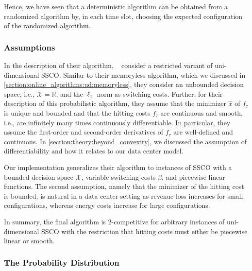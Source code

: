 Hence, we have seen that a deterministic algorithm can be obtained from a randomized algorithm by, in each time slot, choosing the expected configuration of the randomized algorithm.

\subsubsection{Assumptions}

In the description of their algorithm, \citeauthor{Bansal2015}~\cite{Bansal2015} consider a restricted variant of uni-dimensional SSCO. Similar to their memoryless algorithm, which we discussed in \cref{section:online_algorithms:ud:memoryless}, they consider an unbounded decision space, i.e., $\mathcal{X} = \mathbb{R}$, and the $\ell_1$ norm as switching costs. Further, for their description of this probabilistic algorithm, they assume that the minimizer $\hat{x}$ of $f_{\tau}$ is unique and bounded and that the hitting costs $f_{\tau}$ are continuous and smooth, i.e., are infinitely many times continuously differentiable. In particular, they assume the first-order and second-order derivatives of $f_{\tau}$ are well-defined and continuous. In \cref{section:theory:beyond_convexity}, we discussed the assumption of differentiability and how it relates to our data center model.

Our implementation generalizes their algorithm to instances of SSCO with a bounded decision space $\mathcal{X}$, variable switching costs $\beta$, and piecewise linear functions. The second assumption, namely that the minimizer of the hitting cost is bounded, is natural in a data center setting as revenue loss increases for small configurations, whereas energy costs increase for large configurations.

In summary, the final algorithm is $2$-competitive for arbitrary instances of uni-dimensional SSCO with the restriction that hitting costs must either be piecewise linear or smooth.

\subsubsection{The Probability Distribution}

